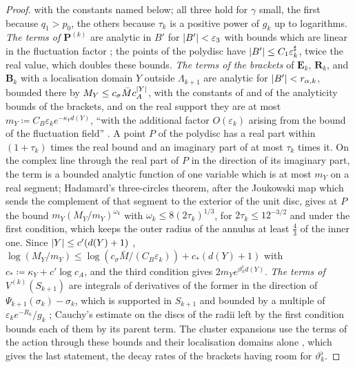 \documentclass[11pt]{preprint}
\DeclarePairedDelimiter{\abs}{\lvert}{\rvert}
\numberwithin{equation}{section}
\theoremstyle{definition}
\theoremstyle{remark}
\theoremstyle{plain}
\begin{document}
\begin{proof}
with the constants named below; all three hold for $\gamma$ small, the first because $q_1 > p_0$, the others because $\tau_k$ is a positive power of $g_k$ up to logarithms. \emph{The terms of $\mathbf P^{(k)}$} are analytic in $B'$ for $\abs{B'} < \varepsilon_3$ with bounds which are linear in the fluctuation factor \cite[Sect.~1]{BalabanRG2}; the points of the polydisc have $\abs{B'} \leq C_1\varepsilon^\sharp_k$, twice the real value, which doubles these bounds. \emph{The terms of the brackets} of $\mathbf E_k$, $\mathbf R_k$, and $\mathbf B_k$ with a localisation domain $Y$ outside $\Lambda_{k+1}$ are analytic for $\abs{B'} < r_{\alpha,k}$, bounded there by $M_Y \leq c_\sigma\bar Mc_A^{\abs Y}$, with the constants of \cite[(2.42), p.~261]{BalabanCRE} and of the analyticity bounds of the brackets, and on the real support they are at most $m_Y \coloneqq C_B\varepsilon_ke^{-\kappa_Yd(Y)}$, ``with the additional factor $O(\varepsilon_k)$ arising from the bound of the fluctuation field'' \cite[p.~277]{BalabanCRE}. A point $P$ of the polydisc has a real part within $(1 + \tau_k)$ times the real bound and an imaginary part of at most $\tau_k$ times it. On the complex line through the real part of $P$ in the direction of its imaginary part, the term is a bounded analytic function of one variable which is at most $m_Y$ on a real segment; Hadamard's three-circles theorem, after the Joukowski map which sends the complement of that segment to the exterior of the unit disc, gives at $P$ the bound $m_Y(M_Y/m_Y)^{\omega_k}$ with $\omega_k \leq 8(2\tau_k)^{1/3}$, for $2\tau_k \leq 12^{-3/2}$ and under the first condition, which keeps the outer radius of the annulus at least $\frac43$ of the inner one. Since $\abs Y \leq c'(d(Y) + 1)$ \cite[(1.28), p.~9]{BalabanRG2}, $\log(M_Y/m_Y) \leq \log(c_\sigma\bar M/(C_B\varepsilon_k)) + c_*(d(Y) + 1)$ with $c_* \coloneqq \kappa_Y + c'\log c_A$, and the third condition gives $2m_Ye^{\vartheta^\flat_kd(Y)}$. \emph{The terms of $V^{(k)}(S_{k+1})$} are integrals of derivatives of the former in the direction of $\Psi_{k+1}(\sigma_k) - \sigma_k$, which is supported in $S_{k+1}$ and bounded by a multiple of $\varepsilon_ke^{-R_k}/g_k$ \cite[p.~269]{BalabanCRE}; Cauchy's estimate on the discs of the radii left by the first condition bounds each of them by its parent term. The cluster expansions use the terms of the action through these bounds and their localisation domains alone \cite[(2.1)--(2.5), p.~12]{BalabanRG2}, which gives the last statement, the decay rates of the brackets having room for $\vartheta^\flat_k$.
\end{proof}
\end{document}
